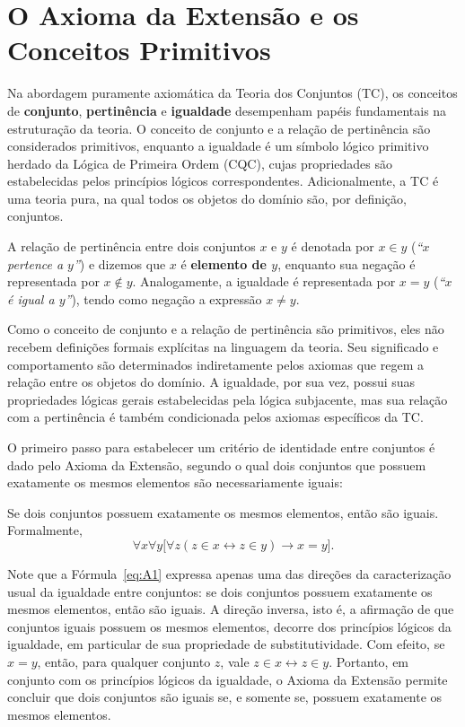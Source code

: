 \section{O Axioma da Extensão e os Conceitos Primitivos}\label{sec:axioma-extensao}

Na abordagem puramente axiomática da Teoria dos Conjuntos (TC), os conceitos de \textbf{conjunto}, \textbf{pertinência} e \textbf{igualdade} desempenham papéis fundamentais na estruturação da teoria. O conceito de conjunto e a relação de pertinência são considerados primitivos, enquanto a igualdade é um símbolo lógico primitivo herdado da Lógica de Primeira Ordem (CQC), cujas propriedades são estabelecidas pelos princípios lógicos correspondentes. Adicionalmente, a TC é uma teoria pura, na qual todos os objetos do domínio são, por definição, conjuntos.

A relação de pertinência entre dois conjuntos $x$ e $y$ é denotada por $x \in y$ (\textit{``$x$ pertence a $y$''}) e dizemos que $x$ é \textbf{elemento de $y$}, enquanto sua negação é representada por $x \notin y$. Analogamente, a igualdade é representada por $x = y$ (\textit{``$x$ é igual a $y$''}), tendo como negação a expressão $x \neq y$.

Como o conceito de conjunto e a relação de pertinência são primitivos, eles não recebem definições formais explícitas na linguagem da teoria. Seu significado e comportamento são determinados indiretamente pelos axiomas que regem a relação entre os objetos do domínio. A igualdade, por sua vez, possui suas propriedades lógicas gerais estabelecidas pela lógica subjacente, mas sua relação com a pertinência é também condicionada pelos axiomas específicos da TC.

O primeiro passo para estabelecer um critério de identidade entre conjuntos é dado pelo Axioma da Extensão, segundo o qual dois conjuntos que possuem exatamente os mesmos elementos são necessariamente iguais:

\begin{axioma}[Extensão]\label{ax:extensao}
Se dois conjuntos possuem exatamente os mesmos elementos, então são iguais. Formalmente,
\begin{equation}\label{eq:A1}
    \forall x \forall y \bigl[
        \forall z (z \in x \leftrightarrow z \in y)
        \rightarrow x = y
    \bigr].
\end{equation}
\end{axioma}

Note que a Fórmula~\eqref{eq:A1} expressa apenas uma das direções da caracterização usual da igualdade entre conjuntos: se dois conjuntos possuem exatamente os mesmos elementos, então são iguais. A direção inversa, isto é, a afirmação de que conjuntos iguais possuem os mesmos elementos, decorre dos princípios lógicos da igualdade, em particular de sua propriedade de substitutividade. Com efeito, se $x = y$, então, para qualquer conjunto $z$, vale $z \in x \leftrightarrow z \in y$. Portanto, em conjunto com os princípios lógicos da igualdade, o Axioma da Extensão permite concluir que dois conjuntos são iguais se, e somente se, possuem exatamente os mesmos elementos.

